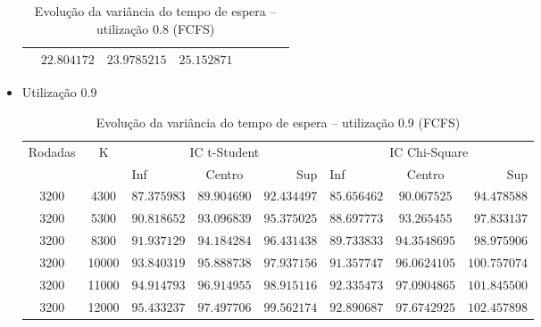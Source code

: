 \documentclass[a4paper]{article}
\begin{document}
\begin{itemize}
\begin{table}[h!]
\begin{tabular}{|c|c|lcr|lcr|}
                &$ 22.804172 $&$ 23.9785215 $&$ 25.152871 $\\\hline
        \end{tabular}
        \caption{Evolução da variância do tempo de espera --
            utilização 0.8 (FCFS)}
    \end{table}
    \item Utilização 0.9
    \begin{table}[h!]
        \centering
        \begin{tabular}{|c|c|lcr|lcr|}\hline
            \multirow{2}{3.75em}{Rodadas}
                & \multirow{2}{1em}{K}
                & \multicolumn{3}{|c|}{IC t-Student}
                & \multicolumn{3}{|c|}{IC Chi-Square} \\
            && Inf & Centro & Sup & Inf & Centro & Sup \\\hline
            3200 & 4300
                &$ 87.375983 $&$ 89.904690 $&$ 92.434497 $
                &$ 85.656462 $&$ 90.067525 $&$ 94.478588 $\\\hline
            3200 & 5300
                &$ 90.818652 $&$ 93.096839 $&$ 95.375025 $
                &$ 88.697773 $&$ 93.265455 $&$ 97.833137 $\\\hline
            3200 & 8300
                &$ 91.937129 $&$ 94.184284 $&$ 96.431438 $
                &$ 89.733833 $&$ 94.3548695 $&$ 98.975906 $\\\hline
            3200 & 10000
                &$ 93.840319 $&$ 95.888738 $&$ 97.937156 $
                &$ 91.357747 $&$ 96.0624105 $&$ 100.757074 $\\\hline
            3200 & 11000
                &$ 94.914793 $&$ 96.914955 $&$ 98.915116 $
                &$ 92.335473 $&$ 97.0904865 $&$ 101.845500 $\\\hline
            3200 & 12000
                &$ 95.433237 $&$ 97.497706 $&$ 99.562174 $
                &$ 92.890687 $&$ 97.6742925 $&$ 102.457898 $\\\hline
        \end{tabular}
        \caption{Evolução da variância do tempo de espera --
            utilização 0.9 (FCFS)}
    \end{table}
\end{itemize}
\end{document}
